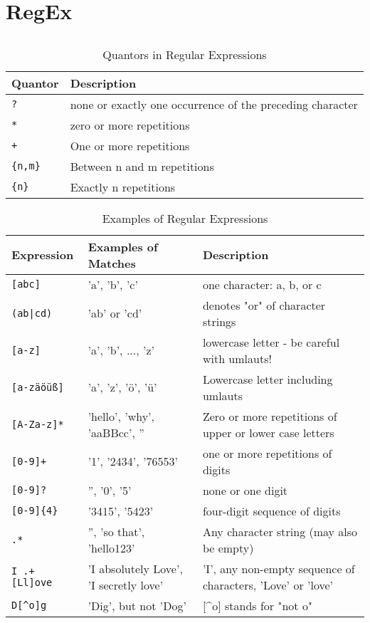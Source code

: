 \section{RegEx}
\subsection*{}
\begin{table}[H]
\centering
\begin{tabularx}{\linewidth}{|l|X|}
\hline
\textbf{Quantor} & \textbf{Description} \\ \hline
\texttt{?} & none or exactly one occurrence of the preceding character \\ \hline
\texttt{*} & zero or more repetitions \\ \hline
\texttt{+} & One or more repetitions \\ \hline
\texttt{\{n,m\}} & Between n and m repetitions \\ \hline
\texttt{\{n\}} & Exactly n repetitions \\ \hline
\end{tabularx}
\caption{Quantors in Regular Expressions}
\label{tab:quantors}
\end{table}

\begin{table}[H]
\centering
\begin{tabularx}{\linewidth}{|X|L|X|}
\hline
\textbf{Expression} & \textbf{Examples of Matches} & \textbf{Description} \\ \hline
\texttt{[abc]} & 'a', 'b', 'c' & one character: a, b, or c \\ \hline
\texttt{(ab|cd)} & 'ab' or 'cd' & \textbar{} denotes "or" of character strings \\ \hline
\texttt{[a-z]} & 'a', 'b', ..., 'z' & lowercase letter - be careful with umlauts! \\ \hline
\texttt{[a-zäöüß]} & 'a', 'z', 'ö', 'ü' & Lowercase letter including umlauts \\ \hline
\texttt{[A-Za-z]*} & 'hello', 'why', 'aaBBcc', '' & Zero or more repetitions of upper or lower case letters \\ \hline
\texttt{[0-9]+} & '1', '2434', '76553' & one or more repetitions of digits \\ \hline
\texttt{[0-9]?}   & '', '0', '5' & none or one digit \\ \hline
\texttt{[0-9]\{4\}} & '3415', '5423' & four-digit sequence of digits \\ \hline
\texttt{.*} & '', 'so that', 'hello123' & Any character string (may also be empty) \\ \hline
\texttt{I .+ [Ll]ove} & 'I absolutely Love', 'I secretly love' & 'I', any non-empty sequence of characters, 'Love' or 'love' \\ \hline
\texttt{D[\^{}o]g} & 'Dig', but not 'Dog' & [\^{}o] stands for "not o" \\ \hline
\end{tabularx}
\caption{Examples of Regular Expressions}
\label{tab:regex-examples}
\end{table}

